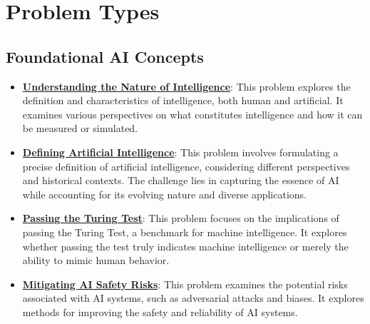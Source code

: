 \documentclass{article}%
\begin{document}
%
\section{Problem Types}%
\label{sec:ProblemTypes}%
\subsection{Foundational AI Concepts}%
\label{subsec:FoundationalAIConcepts}%
\begin{itemize}[leftmargin=*]%
\item \href{https://purdue.brightspace.com/d2l/common/assets/pdfjs-d2l-dist/1.0.14-legacy/web/viewer.html?file=\%2Fcontent\%2Fenforced\%2F1095467-wl.202510.CS.24300.001\%2F02L2-Intro.pdf\%3Fou\%3D1095467\&lang=en-us\&container=d2l-fileviewer-rendered-pdf\&fullscreen=d2l-fileviewer-rendered-pdf-dialog\&height=667#page=5}{\textbf{Understanding the Nature of Intelligence}}: This problem explores the definition and characteristics of intelligence, both human and artificial. It examines various perspectives on what constitutes intelligence and how it can be measured or simulated.%
\item \href{https://purdue.brightspace.com/d2l/common/assets/pdfjs-d2l-dist/1.0.14-legacy/web/viewer.html?file=\%2Fcontent\%2Fenforced\%2F1095467-wl.202510.CS.24300.001\%2F02L2-Intro.pdf\%3Fou\%3D1095467\&lang=en-us\&container=d2l-fileviewer-rendered-pdf\&fullscreen=d2l-fileviewer-rendered-pdf-dialog\&height=667#page=5}{\textbf{Defining Artificial Intelligence}}: This problem involves formulating a precise definition of artificial intelligence, considering different perspectives and historical contexts. The challenge lies in capturing the essence of AI while accounting for its evolving nature and diverse applications.%
\item \href{https://purdue.brightspace.com/d2l/common/assets/pdfjs-d2l-dist/1.0.14-legacy/web/viewer.html?file=\%2Fcontent\%2Fenforced\%2F1095467-wl.202510.CS.24300.001\%2F02L2-Intro.pdf\%3Fou\%3D1095467\&lang=en-us\&container=d2l-fileviewer-rendered-pdf\&fullscreen=d2l-fileviewer-rendered-pdf-dialog\&height=667#page=6}{\textbf{Passing the Turing Test}}: This problem focuses on the implications of passing the Turing Test, a benchmark for machine intelligence. It explores whether passing the test truly indicates machine intelligence or merely the ability to mimic human behavior.%
\item \href{https://purdue.brightspace.com/d2l/common/assets/pdfjs-d2l-dist/1.0.14-legacy/web/viewer.html?file=\%2Fcontent\%2Fenforced\%2F1095467-wl.202510.CS.24300.001\%2F02L2-Intro.pdf\%3Fou\%3D1095467\&lang=en-us\&container=d2l-fileviewer-rendered-pdf\&fullscreen=d2l-fileviewer-rendered-pdf-dialog\&height=667#page=19}{\textbf{Mitigating AI Safety Risks}}: This problem examines the potential risks associated with AI systems, such as adversarial attacks and biases. It explores methods for improving the safety and reliability of AI systems.%

\end{itemize}
\end{document}
